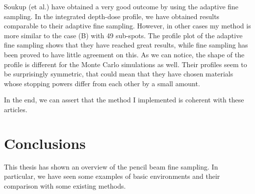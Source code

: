 \documentclass[12pt, a4paper, twoside]{book}
\begin{document}
Soukup (et al.) have obtained a very good outcome by using the adaptive fine sampling. In the integrated depth-dose profile, we have obtained results comparable to their adaptive fine sampling. However, in other cases my method is more similar to the case (B) with 49 sub-spots. The profile plot of the adaptive fine sampling shows that they have reached great results, while fine sampling has been proved to have little agreement on this. As we can notice, the shape of the profile is different for the Monte Carlo simulations as well. Their profiles seem to be surprisingly symmetric, that could mean that they have chosen materials whose stopping powers differ from each other by a small amount. 


In the end, we can assert that the method I implemented is coherent with these articles.


\chapter{Conclusions} %

This thesis has shown an overview of the pencil beam fine sampling. In particular, we have seen some examples of basic environments and their comparison with some existing methods. 
\end{document}
